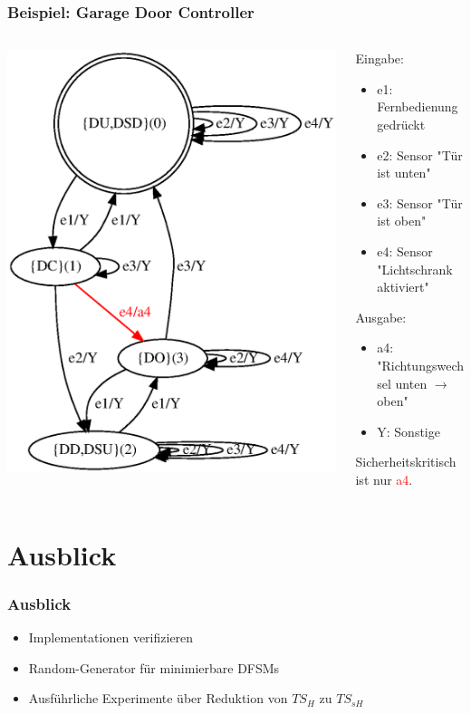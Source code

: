 \documentclass[10pt]{beamer}
\begin{document}
\begin{frame}
\frametitle{Beispiel: Garage Door Controller}
\begin{columns}[T] %
\begin{column}{.53\textwidth}

\includegraphics[width=\textwidth]{images/gdc_abs_min_colored}
\end{column}%
\hfill%
\begin{column}{.55\textwidth}
Eingabe:
\begin{itemize}
  \item e1: Fernbedienung gedrückt
  \item e2: Sensor "Tür ist unten"
  \item e3: Sensor "Tür ist oben"
  \item e4: Sensor "Lichtschrank aktiviert"
\end{itemize}
Ausgabe:
\begin{itemize}
  \item a4: "Richtungswechsel unten $\rightarrow$ oben"
  \item Y: Sonstige
\end{itemize}
Sicherheitskritisch ist nur \textcolor{red}{a4}.
\end{column}%
\end{columns}
\end{frame}

\section{Ausblick}
\begin{frame}
\frametitle{Ausblick}
  \begin{itemize}
    \item Implementationen verifizieren
    \item Random-Generator für minimierbare DFSMs
    \item Ausführliche Experimente über Reduktion von $TS_H$ zu $TS_{sH}$
  \end{itemize}
\end{frame}
\end{document}
